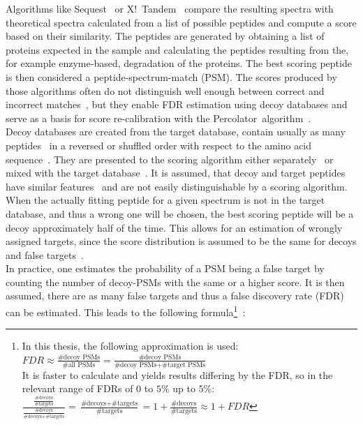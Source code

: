 	Algorithms like Sequest~\cite{Eng1994} or X!~Tandem~\cite{Craig2004} compare the resulting spectra with theoretical spectra calculated from a list of possible peptides and compute a score based on their similarity. The peptides are generated by obtaining a list of proteins expected in the sample and calculating the peptides resulting from the, for example enzyme-based, degradation of the proteins. The best scoring peptide is then considered a peptide-spectrum-match (PSM). The scores produced by those algorithms often do not distinguish well enough between correct and incorrect matches~\cite{Kll2007}, but they enable FDR estimation using decoy databases and serve as a basis for score re-calibration with the Percolator~algorithm~\cite{Kll2007, Granholm2012}.\\
	Decoy databases are created from the target database, contain usually as  many peptides~\cite{Peng2003, Moore2002} in a reversed or shuffled order with respect to the amino acid sequence~\cite{Aggarwal2016}. They are presented to the scoring algorithm either separately~\cite{Granholm2012} or mixed with the target database~\cite{Peng2003}. It is assumed, that decoy and target peptides have similar features~\cite{Moore2002} and are not easily distinguishable by a scoring algorithm. When the actually fitting peptide for a given spectrum is not in the target database, and thus a wrong one will be chosen, the best scoring peptide will be a decoy approximately half of the time. This allows for an estimation of wrongly assigned targets, since the score distribution is assumed to be the same for decoys and false targets~\cite{Aggarwal2016}.\\
	In practice, one estimates the probability of a PSM being a false target by counting the number of decoy-PSMs with the same or a higher score. It is then assumed, there are as many false targets and thus a false discovery rate (FDR) can be estimated. This leads to the following formula\footnote{In this thesis, the following approximation is used:\\
		$FDR \approx \frac{\text{\# decoy PSMs}}{\text{\# all PSMs}} = \frac{\text{\# decoy PSMs}}{\text{\# decoy PSMs} + \text{\# target PSMs}}$\\
		It is faster to calculate and yields results differing by the FDR, so in the relevant range of FDRs of $0$ to $5\%$ up to $5\%$:\\
		$\frac{\frac{\text{\# decoys}}{\text{\# targets}}}{\frac{\text{\# decoys}}{\text{\# decoys} + \text{\# targets}}} = \frac{\text{\# decoys} + \text{\# targets}}{\text{\# targets}} = 1 + \frac{\text{\# decoys}}{\text{\# targets}} \approx 1 + FDR$}~\cite{Granholm2012}:

